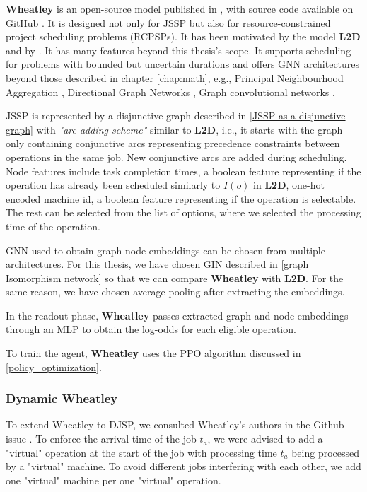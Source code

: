 \textbf{Wheatley} is an open-source model published in \cite{wheatley}, with source code available on GitHub \cite{github_wheatley}. It is designed not only for JSSP but also for resource-constrained project scheduling problems (RCPSPs). It has been motivated by the model \textbf{L2D} and by \cite{DBLP:journals/corr/abs-2104-03760}. It has many features beyond this thesis's scope. It supports scheduling for problems with bounded but uncertain durations and offers GNN architectures beyond those described in chapter \ref{chap:math}, e.g., Principal Neighbourhood Aggregation \cite{DBLP:journals/corr/abs-2004-05718}, Directional Graph Networks \cite{DBLP:journals/corr/abs-2010-02863}, Graph convolutional networks \cite{DBLP:journals/corr/abs-2007-02133}.
\par
JSSP is represented by a disjunctive graph described in \ref{JSSP as a disjunctive graph} with \textit{"arc adding scheme"} similar to \textbf{L2D}, i.e., it starts with the graph only containing conjunctive arcs representing precedence constraints between operations in the same job. New conjunctive arcs are added during scheduling. Node features include task completion times, a boolean feature representing if the operation has already been scheduled similarly to $I(o)$ in \textbf{L2D}, one-hot encoded machine id, a boolean feature representing if the operation is selectable. The rest can be selected from the list of options, where we selected the processing time of the operation.
\par
GNN used to obtain graph node embeddings can be chosen from multiple architectures. For this thesis, we have chosen GIN described in \ref{graph Isomorphism network} so that we can compare \textbf{Wheatley} with \textbf{L2D}. For the same reason, we have chosen average pooling after extracting the embeddings.
\par
In the readout phase, \textbf{Wheatley} passes extracted graph and node embeddings through an MLP to obtain the log-odds for each eligible operation.
\par
To train the agent, \textbf{Wheatley} uses the PPO algorithm discussed in \ref{policy_optimization}.

\subsubsection*{Dynamic Wheatley} \label{dynamicwheatley}
To extend Wheatley to DJSP, we consulted Wheatley's authors in the Github issue \cite{github_wheatley_djsp}. To enforce the arrival time of the job $t_a$, we were advised to add a "virtual" operation at the start of the job with processing time $t_a$ being processed by a "virtual" machine. To avoid different jobs interfering with each other, we add one "virtual" machine per one "virtual" operation.

